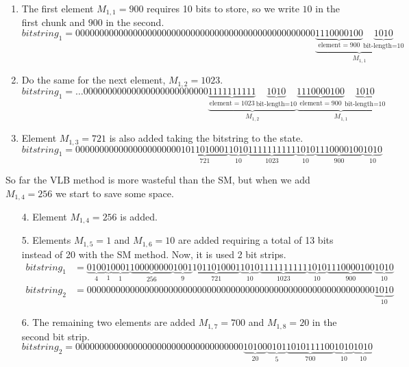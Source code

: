 \documentclass[10pt]{article}
\begin{document}
\begin{enumerate}
 \item The first element $M_{1,1}=900$ requires 10 bits to store, so we write $10$ in the first chunk and $900$ in the second.
 \begin{equation*} \label{eq:09}
 bitstring_1 = 00000000000000000000000000000000000000000000000000\underbrace{\underbrace{1110000100}_{\text{element} = 900}\underbrace{1010}_{\text{bit-length=10}}}_{M_{1,1}}
\end{equation*}
 \item Do the same for the next element, $M_{1,2}=1023$.
  \begin{equation*} \label{eq:10}
 bitstring_1 = \ldots00000000000000000000000000\underbrace{\underbrace{1111111111}_{\text{element} = 1023}\underbrace{1010}_{\text{bit-length=10}}}_{M_{1,2}}\underbrace{\underbrace{1110000100}_{\text{element} = 900}\underbrace{1010}_{\text{bit-length=10}}}_{M_{1,1}}
\end{equation*}
 \item Element $M_{1,3}=721$ is also added taking the bitstring to the state.
 \begin{equation*} \label{eq:11}
 bitstring_1 = 
 0000000000000000000000\underbrace{1011010001}_{721}\underbrace{1010}_{10}\underbrace{1111111111}_{1023}\underbrace{1010}_{10}\underbrace{1110000100}_{900}\underbrace{1010}_{10}
\end{equation*}
\end{enumerate}

So far the VLB method is more wasteful than the SM, but when we add $M_{1,4} =256$  we start to save some space.

\begin{enumerate}
 \item[4.] Element $M_{1,4} =256$ is added.  
 \item [5.] Elements $M_{1,5} =1$ and $M_{1,6} =10$ are added requiring a total of 13 bits instead of 20 with the SM method. Now, it is used 2 bit strips.
 \begin{align*} \label{eq:12}
 bitstring_1 &=
 \underbrace{0100}_{4}\underbrace{1}_{1}\underbrace{0001}_{1}\underbrace{100000000}_{256}\underbrace{1001}_{9}\underbrace{1011010001}_{721}\underbrace{1010}_{10}\underbrace{1111111111}_{1023}\underbrace{1010}_{10}\underbrace{1110000100}_{900}\underbrace{1010}_{10} \\
 bitstring_2 &= 000000000000000000000000000000000000000000000000000000000000\underbrace{1010}_{10}
\end{align*}
 \item [6.] The remaining two elements are added $M_{1,7} =700$ and $M_{1,8} =20$ in the second bit strip.
 \begin{equation*} \label{eq:13}
 bitstring_2 = 00000000000000000000000000000000000\underbrace{10100}_{20}\underbrace{0101}_{5}\underbrace{1010111100}_{700}\underbrace{1010}_{10}\underbrace{1010}_{10}
\end{equation*}
\end{enumerate}
\end{document}
